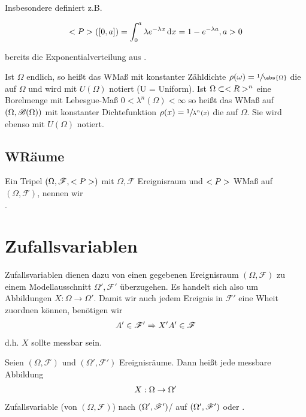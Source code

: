 Insbesondere definiert z.B.

\begin{align}
	<P>([0,a]) = \int_{0}^{a} \lambda e^{-\lambda x}\,\mathrm{d} x = 1 - e^{-\lambda a}, a > 0 \notag
\end{align}

bereits die Exponentialverteilung aus .

\begin{definition}[Gleichverteilung]
	Ist $\Omega$ endlich, so heißt das WMaß mit konstanter Zähldichte $\rho(\omega) = \sfrac{1}{\abs{\Omega}}$ die  auf $\Omega$ und wird mit $U(\Omega)$ notiert (U = Uniform).
	Ist $\Omega \subset <R>^n$ eine Borelmenge mit Lebesgue-Maß $0 < \lambda^n(\Omega) < \infty$ so heißt das WMaß auf $(\Omega, \mathscr{B}(\Omega))$ mit konstanter Dichtefunktion $\rho(x) = \sfrac{1}{\lambda^n(x)}$ die  auf $\Omega$. 
	Sie wird ebenso mit $U(\Omega)$ notiert.
\end{definition}

\subsection*{WRäume}

\begin{definition}[Wahrscheinlichkeitsraum]
	Ein Tripel $(\Omega, \mathscr{F}, <P>)$ mit $\Omega, \mathscr{F}$ Ereignisraum und $<P>$ WMaß auf $(\Omega, \mathscr{F})$, nennen wir \\ .
\end{definition}

\section{Zufallsvariablen}

Zufallsvariablen dienen dazu von einen gegebenen Ereignisraum $(\Omega, \mathscr{F})$ zu einem Modellausschnitt $\Omega', \mathscr{F}'$ überzugehen. 
Es handelt sich also um Abbildungen $X: \Omega \to \Omega'$.
Damit wir auch jedem Ereignis in $\mathscr{F}'$ eine Wheit zuordnen können, benötigen wir	
\begin{align}
	A' \in \mathscr{F}' \Rightarrow X' A' \in \mathscr{F} \notag		
\end{align}
d.h. $X$ sollte messbar sein.

\begin{definition}[Zufallsvariable]
	Seien $(\Omega, \mathscr{F})$ und $(\Omega', \mathscr{F}')$ Ereignisräume. Dann heißt jede messbare Abbildung
	\begin{align}
		X: \Omega \to \Omega'\notag
	\end{align}
	Zufallsvariable (von $(\Omega, \mathscr{F})$) nach $(\Omega', \mathscr{F}')$/ auf $(\Omega', \mathscr{F}')$ oder .
\end{definition}

